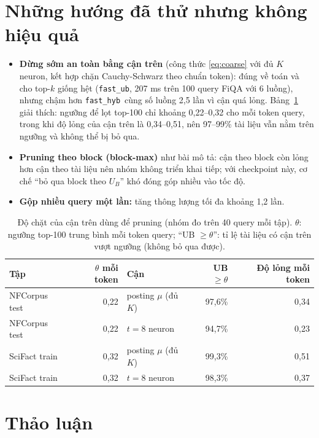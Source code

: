 \documentclass[a4paper,13pt]{extreport}
\theoremstyle{plain}
\newcommand{\fasthyb}{\texttt{fast\_hyb}}
\begin{document}
\section{Những hướng đã thử nhưng không hiệu quả}
\label{sec:opt-failed}
\begin{itemize}[leftmargin=1.5cm]
  \item \textbf{Dừng sớm an toàn bằng cận trên} (công thức \eqref{eq:coarse} với đủ $K$ neuron, kết hợp chặn Cauchy-Schwarz theo chuẩn token): đúng về toán và cho top-$k$ giống hệt (\texttt{fast\_ub}, 207 ms trên 100 query FiQA với 6 luồng), nhưng chậm hơn \fasthyb\ cùng số luồng 2,5 lần vì cận quá lỏng. Bảng~\ref{tab:bound} giải thích: ngưỡng để lọt top-100 chỉ khoảng 0,22--0,32 cho mỗi token query, trong khi độ lỏng của cận trên là 0,34--0,51, nên 97--99\% tài liệu vẫn nằm trên ngưỡng và không thể bị bỏ qua.
  \item \textbf{Pruning theo block (block-max)} như bài mô tả: cận theo block còn lỏng hơn cận theo tài liệu nên nhóm không triển khai tiếp; với checkpoint này, cơ chế ``bỏ qua block theo $U_B$'' khó đóng góp nhiều vào tốc độ.
  \item \textbf{Gộp nhiều query một lần:} tăng thông lượng tối đa khoảng 1,2 lần.
\end{itemize}
\begin{table}[htbp]
\centering
\caption[Độ chặt của cận trên dùng để pruning (nhóm đo)]{Độ chặt của cận trên dùng để pruning (nhóm đo trên 40 query mỗi tập). $\theta$: ngưỡng top-100 trung bình mỗi token query; ``UB $\ge\theta$'': tỉ lệ tài liệu có cận trên vượt ngưỡng (không bỏ qua được).}
\label{tab:bound}
\small
\begin{tabular}{lrlrr}
\toprule
\textbf{Tập} & $\theta$ mỗi token & \textbf{Cận} & \textbf{UB $\ge\theta$} & \textbf{Độ lỏng mỗi token}\\
\midrule
NFCorpus test & 0,22 & posting $\mu$ (đủ $K$) & 97,6\% & 0,34\\
NFCorpus test & 0,22 & $t=8$ neuron & 94,7\% & 0,23\\
SciFact train & 0,32 & posting $\mu$ (đủ $K$) & 99,3\% & 0,51\\
SciFact train & 0,32 & $t=8$ neuron & 98,3\% & 0,37\\
\bottomrule
\end{tabular}
\end{table}

\section{Thảo luận}
\label{sec:discussion}
\end{document}
